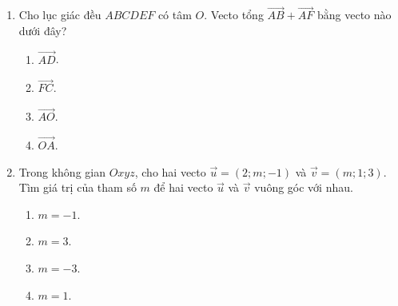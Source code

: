 \documentclass[12pt]{article}
\begin{document}
\begin{enumerate}[label=\textbf{Câu \arabic*.}, leftmargin=*]
\begin{center}
		\end{center}
		Gọi $M, m$ lần lượt là giá trị lớn nhất và nhỏ nhất của hàm số trên đoạn $[-2; 4]$. Tính $M + m$.
		\begin{multicols}{4}
			\begin{enumerate}[label=\Alph*.]
				\item $2$.
				\item $4$.
				\item $-1$.
				\item $7$.
			\end{enumerate}
		\end{multicols}
		
		\item Cho lục giác đều $ABCDEF$ có tâm $O$. Vecto tổng $\overrightarrow{AB} + \overrightarrow{AF}$ bằng vecto nào dưới đây?
		\begin{multicols}{4}
			\begin{enumerate}[label=\Alph*.]
				\item $\overrightarrow{AD}$.
				\item $\overrightarrow{FC}$.
				\item $\overrightarrow{AO}$.
				\item $\overrightarrow{OA}$.
			\end{enumerate}
		\end{multicols}
		
		\item Trong không gian $Oxyz$, cho hai vecto $\vec{u} = (2; m; -1)$ và $\vec{v} = (m; 1; 3)$. Tìm giá trị của tham số $m$ để hai vecto $\vec{u}$ và $\vec{v}$ vuông góc với nhau.
		\begin{multicols}{4}
			\begin{enumerate}[label=\Alph*.]
				\item $m = -1$.
				\item $m = 3$.
				\item $m = -3$.
				\item $m = 1$.
			\end{enumerate}
		\end{multicols}
		
	\end{enumerate}
	
\end{document}
